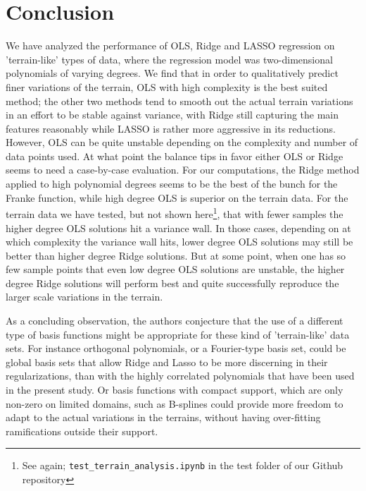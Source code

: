 \documentclass[reprint, english, nofootinbib]{revtex4-2}
\begin{document}
\section{Conclusion}


We have analyzed the performance of OLS, Ridge and LASSO regression on 'terrain-like' types of data, where the regression model was two-dimensional polynomials of varying degrees. We find that in order to qualitatively predict finer variations of the terrain,  OLS with high complexity is the best suited method; the other two methods tend to smooth out the actual terrain variations in an effort to be stable against variance, with Ridge still capturing the main features reasonably while LASSO is rather more aggressive in its reductions. However, OLS can be quite unstable depending on the complexity and number of data points used. At what point the balance tips in favor either OLS or Ridge seems to need a case-by-case evaluation. For our computations, the Ridge method applied to high polynomial degrees seems to be the best of the bunch for the Franke function, while high degree OLS is superior on the terrain data. For the terrain data we have tested, but not shown here\footnote{See again; \lstinline{test_terrain_analysis.ipynb} in the test folder of our Github repository}, that with fewer samples the higher degree OLS solutions hit a variance wall. In those cases, depending on at which complexity the variance wall hits, lower degree OLS solutions may still be better than higher degree Ridge solutions. But at some point, when one has so few sample points that even low degree OLS solutions are unstable, the higher degree Ridge solutions will perform best and quite successfully reproduce the larger scale variations in the terrain.

As a concluding observation, the authors conjecture that the use of a different type of basis functions might be appropriate for these kind of 'terrain-like' data sets. For instance orthogonal polynomials, or a Fourier-type basis set, could be global basis sets that allow Ridge and Lasso to be more discerning in their regularizations, than with the highly correlated polynomials that have been used in the present study. Or basis functions with compact support, which are only non-zero on limited domains, such as B-splines could provide more freedom to adapt to the actual variations in the terrains, without having over-fitting ramifications outside their support.


\onecolumngrid

\newpage
\twocolumngrid
\appendix
\end{document}
